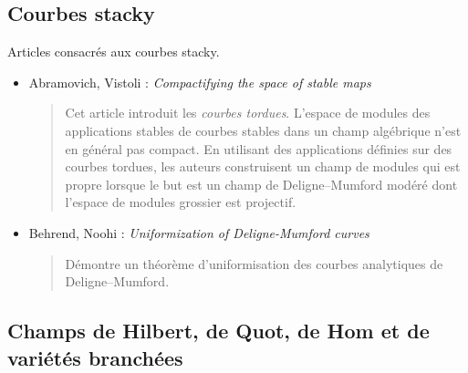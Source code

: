 \subsection{Courbes stacky}
\label{subsection-stacky-curves}

\noindent
Articles consacrés aux courbes stacky.
\begin{itemize}
\item Abramovich, Vistoli : \emph{Compactifying the space of stable maps}
\cite{abramovich-vistoli}
\begin{quote}
Cet article introduit les \emph{courbes tordues}. L'espace de modules des
applications stables de courbes stables dans un champ algébrique n'est en
général pas compact. En utilisant des applications définies sur des courbes
tordues, les auteurs construisent un champ de modules qui est propre lorsque
le but est un champ de Deligne--Mumford modéré dont l'espace de modules
grossier est projectif.
\end{quote}
\item Behrend, Noohi : \emph{Uniformization of Deligne-Mumford curves}
\cite{behrend-noohi}
\begin{quote}
Démontre un théorème d'uniformisation des courbes analytiques de
Deligne--Mumford.
\end{quote}
\end{itemize}

\subsection{Champs de Hilbert, de Quot, de Hom et de variétés branchées}
\label{subsection-hilbert-quot-hom}

